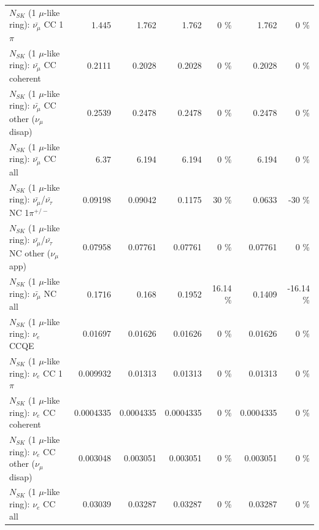 \begin{table}
\begin{tabular}{| l | r | r | r  r | r  r |}
                         $N_{SK}$ (1 $\mu$-like ring): $\bar{\nu_\mu}$ CC 1$\pi$ &           1.445 &           1.762 &           1.762 &        0 \%  &           1.762 &        0 \%  \\ 
                       $N_{SK}$ (1 $\mu$-like ring): $\bar{\nu_\mu}$ CC coherent &          0.2111 &          0.2028 &          0.2028 &        0 \%  &          0.2028 &        0 \%  \\ 
        $N_{SK}$ (1 $\mu$-like ring): $\bar{\nu_\mu}$ CC other ($\nu_\mu$ disap) &          0.2539 &          0.2478 &          0.2478 &        0 \%  &          0.2478 &        0 \%  \\ 
                          $N_{SK}$ (1 $\mu$-like ring): $\bar{\nu_{\mu}}$ CC all &            6.37 &           6.194 &           6.194 &        0 \%  &           6.194 &        0 \%  \\ 
\hline
  $N_{SK}$ (1 $\mu$-like ring): $\bar{\nu_\mu}$/$\bar{\nu_\tau}$ NC 1$\pi^{+/-}$ &         0.09198 &         0.09042 &          0.1175 &       30 \%  &          0.0633 &      -30 \%  \\ 
$N_{SK}$ (1 $\mu$-like ring): $\bar{\nu_\mu}$/$\bar{\nu_\tau}$ NC other ($\nu_\mu$ app) &         0.07958 &         0.07761 &         0.07761 &        0 \%  &         0.07761 &        0 \%  \\ 
                          $N_{SK}$ (1 $\mu$-like ring): $\bar{\nu_{\mu}}$ NC all &          0.1716 &           0.168 &          0.1952 &    16.14 \%  &          0.1409 &   -16.14 \%  \\ 
\hline
\hline
\hline
                                      $N_{SK}$ (1 $\mu$-like ring): $\nu_e$ CCQE &         0.01697 &         0.01626 &         0.01626 &        0 \%  &         0.01626 &        0 \%  \\ 
                                 $N_{SK}$ (1 $\mu$-like ring): $\nu_e$ CC 1$\pi$ &        0.009932 &         0.01313 &         0.01313 &        0 \%  &         0.01313 &        0 \%  \\ 
                               $N_{SK}$ (1 $\mu$-like ring): $\nu_e$ CC coherent &       0.0004335 &       0.0004335 &       0.0004335 &        0 \%  &       0.0004335 &        0 \%  \\ 
                $N_{SK}$ (1 $\mu$-like ring): $\nu_e$ CC other ($\nu_\mu$ disap) &        0.003048 &        0.003051 &        0.003051 &        0 \%  &        0.003051 &        0 \%  \\ 
                                  $N_{SK}$ (1 $\mu$-like ring): $\nu_{e}$ CC all &         0.03039 &         0.03287 &         0.03287 &        0 \%  &         0.03287 &        0 \%  \\ 

\end{tabular}
\end{table}
